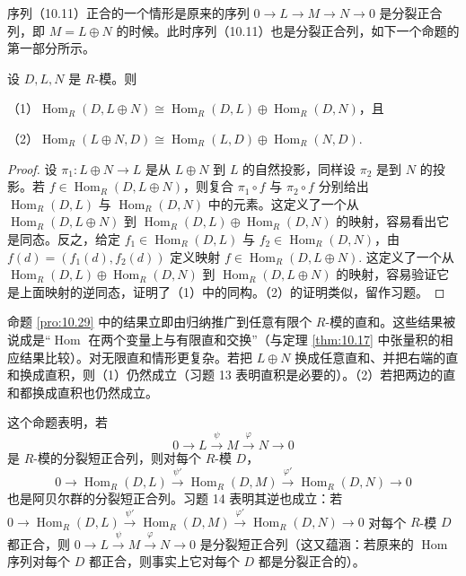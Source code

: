 序列（10.11）正合的一个情形是原来的序列 \(0 \to L \to M \to N \to 0\) 是分裂正合列，即 \(M = L \oplus N\) 的时候。此时序列（10.11）也是分裂正合列，如下一个命题的第一部分所示。

\begin{proposition}\label{pro:10.29}
设 \(D, L, N\) 是 \(R\)-模。则

（1）\(\operatorname{Hom}_R(D, L \oplus N) \cong \operatorname{Hom}_R(D, L) \oplus \operatorname{Hom}_R(D, N)\)，且

（2）\(\operatorname{Hom}_R(L \oplus N, D) \cong \operatorname{Hom}_R(L, D) \oplus \operatorname{Hom}_R(N, D)\).
\end{proposition}

\begin{proof}
设 \(\pi_1 : L \oplus N \to L\) 是从 \(L \oplus N\) 到 \(L\) 的自然投影，同样设 \(\pi_2\) 是到 \(N\) 的投影。若 \(f \in \operatorname{Hom}_R(D, L \oplus N)\)，则复合 \(\pi_1 \circ f\) 与 \(\pi_2 \circ f\) 分别给出 \(\operatorname{Hom}_R(D, L)\) 与 \(\operatorname{Hom}_R(D, N)\) 中的元素。这定义了一个从 \(\operatorname{Hom}_R(D, L \oplus N)\) 到 \(\operatorname{Hom}_R(D, L) \oplus \operatorname{Hom}_R(D, N)\) 的映射，容易看出它是同态。反之，给定 \(f_1 \in \operatorname{Hom}_R(D, L)\) 与 \(f_2 \in \operatorname{Hom}_R(D, N)\)，由 \(f(d) = (f_1(d), f_2(d))\) 定义映射 \(f \in \operatorname{Hom}_R(D, L \oplus N)\). 这定义了一个从 \(\operatorname{Hom}_R(D, L) \oplus \operatorname{Hom}_R(D, N)\) 到 \(\operatorname{Hom}_R(D, L \oplus N)\) 的映射，容易验证它是上面映射的逆同态，证明了（1）中的同构。（2）的证明类似，留作习题。
\end{proof}

命题 \ref{pro:10.29} 中的结果立即由归纳推广到任意有限个 \(R\)-模的直和。这些结果被说成是“\(\operatorname{Hom}\) 在两个变量上与有限直和交换”（与定理 \ref{thm:10.17} 中张量积的相应结果比较）。对无限直和情形更复杂。若把 \(L \oplus N\) 换成任意直和、并把右端的直和换成直积，则（1）仍然成立（习题 13 表明直积是必要的）。（2）若把两边的直和都换成直积也仍然成立。

这个命题表明，若
\[
0 \longrightarrow L \xrightarrow{\ \psi\ } M \xrightarrow{\ \varphi\ } N \longrightarrow 0
\]
是 \(R\)-模的分裂短正合列，则对每个 \(R\)-模 \(D\)，
\[
0 \longrightarrow \operatorname{Hom}_R(D, L) \xrightarrow{\ \psi'\ } \operatorname{Hom}_R(D, M) \xrightarrow{\ \varphi'\ } \operatorname{Hom}_R(D, N) \longrightarrow 0
\]
也是阿贝尔群的分裂短正合列。习题 14 表明其逆也成立：若 \(0 \to \operatorname{Hom}_R(D, L) \xrightarrow{\psi'} \operatorname{Hom}_R(D, M) \xrightarrow{\varphi'} \operatorname{Hom}_R(D, N) \to 0\) 对每个 \(R\)-模 \(D\) 都正合，则 \(0 \to L \xrightarrow{\psi} M \xrightarrow{\varphi} N \to 0\) 是分裂短正合列（这又蕴涵：若原来的 \(\operatorname{Hom}\) 序列对每个 \(D\) 都正合，则事实上它对每个 \(D\) 都是分裂正合的）。

